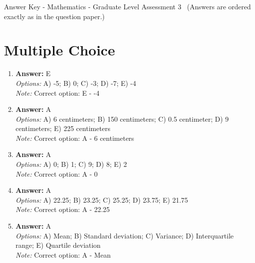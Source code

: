 \documentclass[12pt]{article}
\begin{document}
\begin{center}
Answer Key - Mathematics - Graduate Level Assessment 3 \
\small (Answers are ordered exactly as in the question paper.)
\end{center}

\section*{Multiple Choice}
\begin{enumerate}[label=\arabic*.]
\item \textbf{Answer:} E
\\ \textit{Options:} A) -5; B) 0; C) -3; D) -7; E) -4
\\ \textit{Note:} Correct option: E - -4
\item \textbf{Answer:} A
\\ \textit{Options:} A) 6 centimeters; B) 150 centimeters; C) 0.5 centimeter; D) 9 centimeters; E) 225 centimeters
\\ \textit{Note:} Correct option: A - 6 centimeters
\item \textbf{Answer:} A
\\ \textit{Options:} A) 0; B) 1; C) 9; D) 8; E) 2
\\ \textit{Note:} Correct option: A - 0
\item \textbf{Answer:} A
\\ \textit{Options:} A) 22.25; B) 23.25; C) 25.25; D) 23.75; E) 21.75
\\ \textit{Note:} Correct option: A - 22.25
\item \textbf{Answer:} A
\\ \textit{Options:} A) Mean; B) Standard deviation; C) Variance; D) Interquartile range; E) Quartile deviation
\\ \textit{Note:} Correct option: A - Mean
\end{enumerate}
\end{document}
